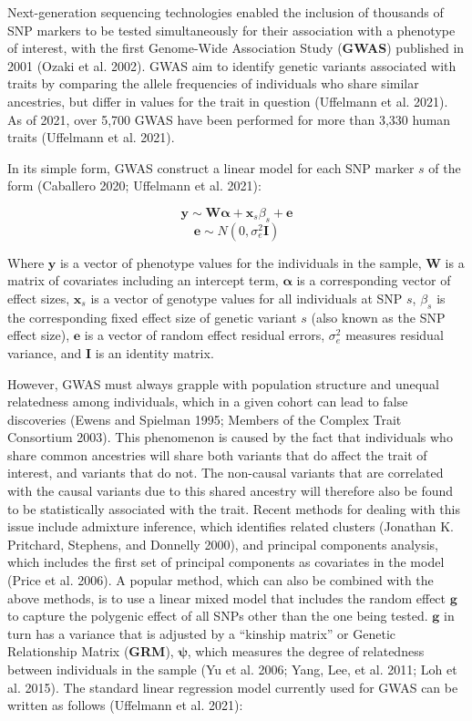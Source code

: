 \documentclass[
]{book}
\begin{document}
Next-generation sequencing technologies enabled the inclusion of thousands of SNP markers to be tested simultaneously for their association with a phenotype of interest, with the first Genome-Wide Association Study (\textbf{GWAS}) published in 2001 (Ozaki et al. 2002). GWAS aim to identify genetic variants associated with traits by comparing the allele frequencies of individuals who share similar ancestries, but differ in values for the trait in question (Uffelmann et al. 2021). As of 2021, over 5,700 GWAS have been performed for more than 3,330 human traits (Uffelmann et al. 2021).

In its simple form, GWAS construct a linear model for each SNP marker \(s\) of the form (Caballero 2020; Uffelmann et al. 2021):

\begin{equation}
\pmb{y} \sim \pmb{W} \pmb{\alpha} + \pmb{x}_s\beta_s + \pmb{e}  \label{eq:gwassimp}
\end{equation}
\begin{equation}
\pmb{e} \sim N(0,\sigma^2_e \pmb{I}) \label{eq:gwassimpe}
\end{equation}

Where \(\pmb{y}\) is a vector of phenotype values for the individuals in the sample, \(\pmb{W}\) is a matrix of covariates including an intercept term, \(\pmb{\alpha}\) is a corresponding vector of effect sizes, \(\pmb{x}_s\) is a vector of genotype values for all individuals at SNP \(s\), \(\beta_s\) is the corresponding fixed effect size of genetic variant \(s\) (also known as the SNP effect size), \(\pmb{e}\) is a vector of random effect residual errors, \(\sigma^2_e\) measures residual variance, and \(\pmb{I}\) is an identity matrix.

However, GWAS must always grapple with population structure and unequal relatedness among individuals, which in a given cohort can lead to false discoveries (Ewens and Spielman 1995; Members of the Complex Trait Consortium 2003). This phenomenon is caused by the fact that individuals who share common ancestries will share both variants that do affect the trait of interest, and variants that do not. The non-causal variants that are correlated with the causal variants due to this shared ancestry will therefore also be found to be statistically associated with the trait. Recent methods for dealing with this issue include admixture inference, which identifies related clusters (Jonathan K. Pritchard, Stephens, and Donnelly 2000), and principal components analysis, which includes the first set of principal components as covariates in the model (Price et al. 2006). A popular method, which can also be combined with the above methods, is to use a linear mixed model that includes the random effect \(\pmb{g}\) to capture the polygenic effect of all SNPs other than the one being tested. \(\pmb{g}\) in turn has a variance that is adjusted by a ``kinship matrix'' or Genetic Relationship Matrix (\textbf{GRM}), \(\pmb{\psi}\), which measures the degree of relatedness between individuals in the sample (Yu et al. 2006; Yang, Lee, et al. 2011; Loh et al. 2015). The standard linear regression model currently used for GWAS can be written as follows (Uffelmann et al. 2021):
\end{document}
